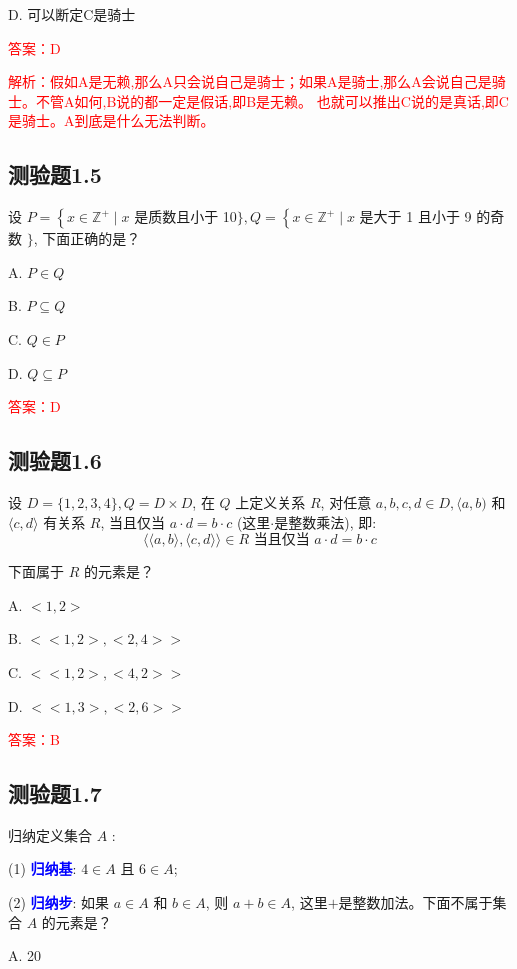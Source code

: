 \documentclass[UTF8, heading=true]{ctexart}
\begin{document}
D. 可以断定C是骑士

\textcolor{red}{答案：D}

\textcolor{red}{解析：假如A是无赖,那么A只会说自己是骑士；如果A是骑士,那么A会说自己是骑士。不管A如何,B说的都一定是假话,即B是无赖。
也就可以推出C说的是真话,即C是骑士。A到底是什么无法判断。}

\subsection{测验题1.5}

设 $P=\left\{x \in \mathbb{Z}^{+} \mid x\right.$ 是质数且小于 10$\}, Q=\left\{x \in \mathbb{Z}^{+} \mid x\right.$ 是大于 1 且小于 9 的奇数 $\}$,
下面正确的是？

A. $P \in Q$

B. $P \subseteq Q$

C. $Q \in P$

D. $Q \subseteq P$

\textcolor{red}{答案：D}

\subsection{测验题1.6}

设 $D=\{1,2,3,4\}, Q=D \times D$, 在 $Q$ 上定义关系 $R$, 对任意 $a, b, c, d \in D,\langle a, b)$ 和 $\langle c, d\rangle$ 有关系 $R$, 当且仅当 $a \cdot d=b \cdot c$ (这里$\cdot$是整数乘法), 即:
$$
\langle\langle a, b\rangle,\langle c, d\rangle\rangle \in R \text { 当且仅当 } a \cdot d=b \cdot c
$$

下面属于 $R$ 的元素是？

A. $<1,2>$

B. $<<1,2>,<2,4>>$

C. $<<1,2>,<4,2>>$

D. $<<1,3>,<2,6>>$

\textcolor{red}{答案：B}

\subsection{测验题1.7}

归纳定义集合 $A$ :

(1) \textcolor{blue}{\textbf{归纳基}}: $4 \in A$ 且 $6 \in A$;

(2) \textcolor{blue}{\textbf{归纳步}}: 如果 $a \in A$ 和 $b \in A$, 则 $a+b \in A$, 这里$+$是整数加法。下面不属于集合 $A$ 的元素是？

A. 20
\end{document}
